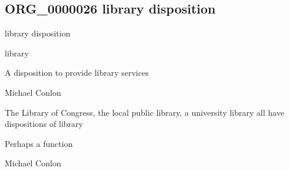 \documentclass[letterpaper,10pt,english]{sphinxmanual}
\begin{document}
\subsection{ORG\_0000026 \sphinxhyphen{} library disposition}
\label{\detokenize{doc-ORG_0000026:org-0000026-library-disposition}}\label{\detokenize{doc-ORG_0000026:index-0}}\label{\detokenize{doc-ORG_0000026::doc}}
\begin{sphinxShadowBox}

\sphinxAtStartPar
library disposition
\end{sphinxShadowBox}

\begin{sphinxShadowBox}

\sphinxAtStartPar
library
\end{sphinxShadowBox}

\begin{sphinxShadowBox}

\sphinxAtStartPar
{\hyperref[\detokenize{doc-BFO_0000016::doc}]{}}
\end{sphinxShadowBox}

\begin{sphinxShadowBox}

\sphinxAtStartPar
A disposition to provide library services
\end{sphinxShadowBox}

\begin{sphinxShadowBox}

\sphinxAtStartPar
Michael Conlon 
\end{sphinxShadowBox}

\begin{sphinxShadowBox}

\sphinxAtStartPar
The Library of Congress, the local public library, a university library all have dispositions of library
\end{sphinxShadowBox}

\begin{sphinxShadowBox}

\sphinxAtStartPar
Perhaps a function
\end{sphinxShadowBox}

\begin{sphinxShadowBox}

\sphinxAtStartPar
Michael Conlon 
\end{sphinxShadowBox}
\begin{quote}

\ignorespaces \end{quote}
\end{document}
